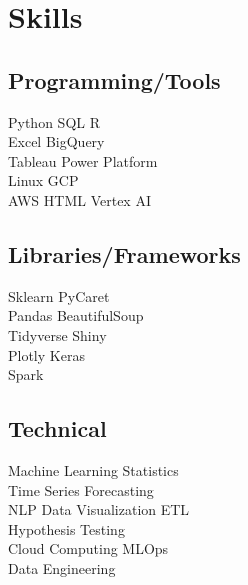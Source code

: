 \documentclass[]{plushcv}
\begin{document}
\begin{minipage}[t]{0.25\textwidth} 


\section{Skills}
\subsection{Programming/Tools}
\sectionsep
{}
Python \textbullet{} SQL \textbullet{} R  \\
Excel \textbullet{} BigQuery \\
\sectionsep
{}
Tableau \textbullet{} Power Platform \textbullet{}  \\
Linux \textbullet{} GCP \\
\sectionsep
{}
AWS \textbullet{} HTML \textbullet{} Vertex AI \\
\sectionsep
\sectionsep
\subsection{Libraries/Frameworks}
\sectionsep
Sklearn \textbullet{} PyCaret \textbullet{} \\
Pandas \textbullet{} BeautifulSoup \textbullet{} \\
Tidyverse \textbullet{} Shiny \\
Plotly \textbullet{} Keras \\
Spark


\sectionsep
\sectionsep
\subsection{Technical}
\sectionsep
Machine Learning \textbullet{} Statistics \\
Time Series Forecasting \textbullet{} \\
NLP  \textbullet{} Data Visualization \textbullet{} ETL \\
Hypothesis Testing \textbullet{} \\ 
Cloud Computing \textbullet{} MLOps \\
Data Engineering \\

\sectionsep



\end{minipage}
\end{document}
